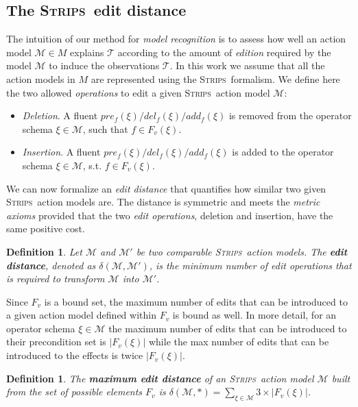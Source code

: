\documentclass[letterpaper]{article} %
\newcommand{\strips}{\textsc{Strips}}     %
\newtheorem{definition}[theorem]{Definition}
\begin{document}
\subsection{The \strips\ edit distance}
The intuition of our method for {\em model recognition} is to assess how well an action model $\mathcal{M}\in M$ explains $\mathcal{T}$ according to the amount of {\em edition} required by the model $\mathcal{M}$ to induce the observations $\mathcal{T}$. In this work we assume that all the action models in $M$ are represented using the \strips\ formalism. We define here the two allowed \emph{operations} to edit a given \strips\ action model $\mathcal{M}$:
\begin{itemize}
\item {\em Deletion}. A fluent $pre_f(\xi)/del_f(\xi)/add_f(\xi)$ is removed from the operator schema $\xi\in\mathcal{M}$, such that $f\in F_v(\xi)$.
\item {\em Insertion}. A fluent $pre_f(\xi)/del_f(\xi)/add_f(\xi)$ is added to the operator schema $\xi\in\mathcal{M}$, s.t. $f\in F_v(\xi)$.
\end{itemize}

We can now formalize an {\em edit distance} that quantifies how similar two given \strips\ action models are. The distance is symmetric and meets the {\em metric axioms} provided that the two {\em edit operations}, deletion and insertion, have the same positive cost.

\begin{definition}
  Let $\mathcal{M}$ and $\mathcal{M}'$ be two {\em comparable} \strips\ action models. The {\bf edit distance}, denoted as $\delta(\mathcal{M},\mathcal{M}')$, is the minimum number of {\em edit operations} that is required to transform $\mathcal{M}$ into $\mathcal{M}'$.
\end{definition}

Since $F_v$ is a bound set, the maximum number of edits that can be introduced to a given action model defined within $F_v$ is bound as well. In more detail, for an operator schema $\xi\in\mathcal{M}$ the maximum number of edits that can be introduced to their precondition set is $|F_v(\xi)|$ while the max number of edits that can be introduced to the effects is twice $|F_v(\xi)|$.
\begin{definition}
The \textbf{maximum edit distance} of an \strips\ action model $\mathcal{M}$ built from the set of possible elements $F_v$ is $\delta(\mathcal{M},*)=\sum_{\xi\in\mathcal{M}} 3\times|F_v(\xi)|$.
\end{definition}
\end{document}
